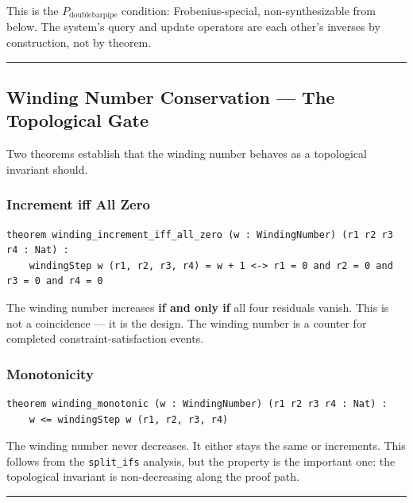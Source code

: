 \documentclass[12pt,a4paper]{article}
\begin{document}
This is the $P_{\text{doublebarpipe}}$ condition: Frobenius-special, non-synthesizable from below. The system's query and update operators are each other's inverses by construction, not by theorem.

\begin{center}
\rule{0.5\textwidth}{0.4pt}
\end{center}

\subsection{Winding Number Conservation --- The Topological Gate}

Two theorems establish that the winding number behaves as a topological invariant should.

\subsubsection{Increment iff All Zero}

\begin{lstlisting}[language=lean]
theorem winding_increment_iff_all_zero (w : WindingNumber) (r1 r2 r3 r4 : Nat) :
    windingStep w (r1, r2, r3, r4) = w + 1 <-> r1 = 0 and r2 = 0 and r3 = 0 and r4 = 0
\end{lstlisting}

The winding number increases \textbf{if and only if} all four residuals vanish. This is not a coincidence --- it is the design. The winding number is a counter for completed constraint-satisfaction events.

\subsubsection{Monotonicity}

\begin{lstlisting}[language=lean]
theorem winding_monotonic (w : WindingNumber) (r1 r2 r3 r4 : Nat) :
    w <= windingStep w (r1, r2, r3, r4)
\end{lstlisting}

The winding number never decreases. It either stays the same or increments. This follows from the \texttt{split\_ifs} analysis, but the property is the important one: the topological invariant is non-decreasing along the proof path.

\begin{center}
\rule{0.5\textwidth}{0.4pt}
\end{center}
\end{document}
